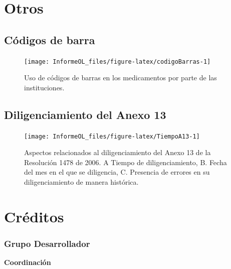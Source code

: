 \documentclass[
  oneside]{book}
\begin{document}
\hypertarget{otros}{%
\chapter{Otros}\label{otros}}

\hypertarget{cuxf3digos-de-barra}{%
\section{Códigos de barra}\label{cuxf3digos-de-barra}}

\begin{figure}

{\centering \texttt{[image: InformeOL\_files/figure-latex/codigoBarras-1]} 

}

\caption{Uso de códigos de barras en los medicamentos por parte de las instituciones.}\label{fig:codigoBarras}
\end{figure}

\hypertarget{diligenciamiento-del-anexo-13}{%
\section{Diligenciamiento del Anexo 13}\label{diligenciamiento-del-anexo-13}}

\begin{figure}

{\centering \texttt{[image: InformeOL\_files/figure-latex/TiempoA13-1]} 

}

\caption{Aspectos relacionados al diligenciamiento del Anexo 13 de la Resolución 1478 de 2006. A Tiempo de diligenciamiento, B. Fecha del mes en el que se diligencia, C. Presencia de errores en su diligenciamiento de manera histórica.}\label{fig:TiempoA13}
\end{figure}

\hypertarget{cruxe9ditos}{%
\chapter*{Créditos}\label{cruxe9ditos}}

\hypertarget{grupo-desarrollador}{%
\subsection*{Grupo Desarrollador}\label{grupo-desarrollador}}

\textbf{Coordinación}
\end{document}
